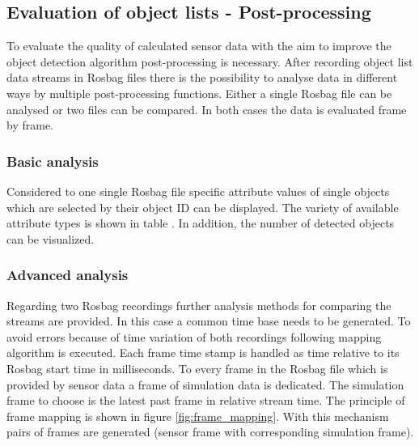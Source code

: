 
\subsection{Evaluation of object lists - Post-processing}
To evaluate the quality of calculated sensor data with the aim to improve the object detection algorithm post-processing is necessary.
After recording object list data streams in Rosbag files there is the possibility to analyse data in different ways by multiple post-processing functions. 
Either a single Rosbag file can be analysed or two files can be compared. In both cases the data is evaluated frame by frame. 


\subsubsection{Basic analysis}

Considered to one single Rosbag file specific attribute values of single objects which are selected by their object ID can be displayed. The variety of available attribute types is shown in table 
. In addition, the number of detected objects can be visualized. \\

\subsubsection{Advanced analysis}
\label{sssec:eval}

Regarding two Rosbag recordings further analysis methods for comparing the streams are provided. In this case a common time base needs to be generated. To avoid errors because of time variation of both recordings following mapping algorithm is executed. Each frame time stamp is handled as time relative to its Rosbag start time in milliseconds. To every frame in the Rosbag file which is provided by sensor data a frame of simulation data is dedicated. The simulation frame to choose is the latest past frame in relative stream time. The principle of frame mapping is shown in figure \ref{fig:frame_mapping}. With this mechanism pairs of frames are generated (sensor frame with corresponding simulation frame).

